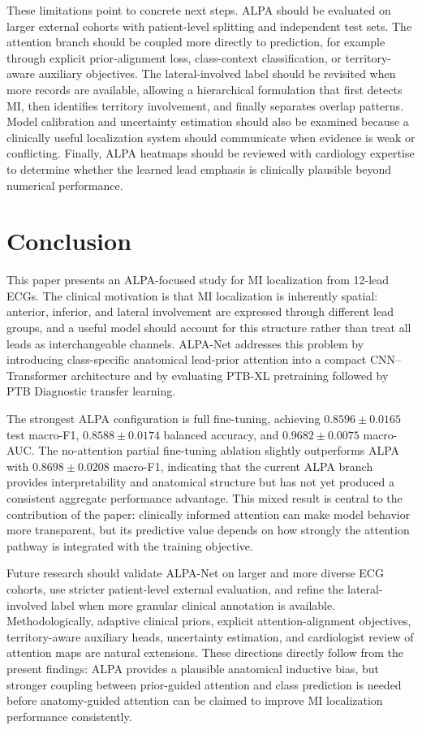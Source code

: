 \documentclass[a4paper,fleqn]{cas-dc}
\begin{document}
These limitations point to concrete next steps. ALPA should be evaluated on larger external cohorts
with patient-level splitting and independent test sets. The attention branch should be coupled more
directly to prediction, for example through explicit prior-alignment loss, class-context
classification, or territory-aware auxiliary objectives. The lateral-involved label should be
revisited when more records are available, allowing a hierarchical formulation that first detects
MI, then identifies territory involvement, and finally separates overlap patterns. Model calibration
and uncertainty estimation should also be examined because a clinically useful localization system
should communicate when evidence is weak or conflicting. Finally, ALPA heatmaps should be reviewed
with cardiology expertise to determine whether the learned lead emphasis is clinically plausible
beyond numerical performance.

\section{Conclusion}
This paper presents an ALPA-focused study for MI localization from 12-lead ECGs. The clinical
motivation is that MI localization is inherently spatial: anterior, inferior, and lateral
involvement are expressed through different lead groups, and a useful model should account for this
structure rather than treat all leads as interchangeable channels. ALPA-Net addresses this problem
by introducing class-specific anatomical lead-prior attention into a compact CNN--Transformer
architecture and by evaluating PTB-XL pretraining followed by PTB Diagnostic transfer learning.

The strongest ALPA configuration is full fine-tuning, achieving $0.8596\pm0.0165$ test macro-F1,
$0.8588\pm0.0174$ balanced accuracy, and $0.9682\pm0.0075$ macro-AUC. The no-attention partial
fine-tuning ablation slightly outperforms ALPA with $0.8698\pm0.0208$ macro-F1, indicating that the
current ALPA branch provides interpretability and anatomical structure but has not yet produced a
consistent aggregate performance advantage. This mixed result is central to the contribution of the
paper: clinically informed attention can make model behavior more transparent, but its predictive
value depends on how strongly the attention pathway is integrated with the training objective.

Future research should validate ALPA-Net on larger and more diverse ECG cohorts, use stricter
patient-level external evaluation, and refine the lateral-involved label when more granular clinical
annotation is available. Methodologically, adaptive clinical priors, explicit attention-alignment
objectives, territory-aware auxiliary heads, uncertainty estimation, and cardiologist review of
attention maps are natural extensions. These directions directly follow from the present findings:
ALPA provides a plausible anatomical inductive bias, but stronger coupling between prior-guided
attention and class prediction is needed before anatomy-guided attention can be claimed to improve
MI localization performance consistently.
\end{document}
